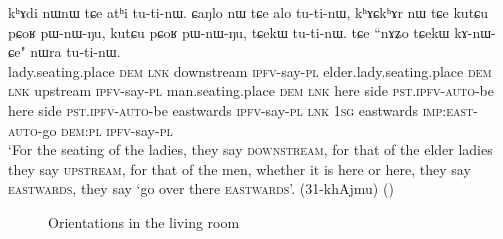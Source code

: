 \begin{exe}
\ex \label{ex:khAjmu.orientation}
\gll kʰɤdi nɯnɯ tɕe atʰi tu-ti-nɯ. ɕaŋlo nɯ tɕe alo tu-ti-nɯ,
kʰɤɕkʰɤr nɯ tɕe kutɕu pɕoʁ pɯ-nɯ-ŋu, kutɕu pɕoʁ pɯ-nɯ-ŋu, 
tɕekɯ tu-ti-nɯ. tɕe ``nɤʑo tɕekɯ kɤ-nɯ-ɕe" nɯra tu-ti-nɯ. \\
lady.seating.place \textsc{dem} \textsc{lnk} {downstream} \textsc{ipfv}-say-\textsc{pl} elder.lady.seating.place \textsc{dem} \textsc{lnk} upstream \textsc{ipfv}-say-\textsc{pl} man.seating.place \textsc{dem} \textsc{lnk} here side \textsc{pst}.\textsc{ipfv}-\textsc{auto}-be here side \textsc{pst}.\textsc{ipfv}-\textsc{auto}-be eastwards \textsc{ipfv}-say-\textsc{pl} \textsc{lnk} \textsc{1sg} eastwards \textsc{imp}:\textsc{east}-\textsc{auto}-go \textsc{dem}:\textsc{pl} \textsc{ipfv}-say-\textsc{pl} \\
\glt `For the seating of the ladies, they say \textsc{downstream}, for that of the elder ladies they say \textsc{upstream}, for that of the men, whether it is here or here, they say \textsc{eastwards}, they say `go over there \textsc{eastwards}'. (31-khAjmu)
()
\end{exe}



\begin{figure} 
\caption{Orientations in the living room}
\label{fig:kitchen}
\end{figure}

